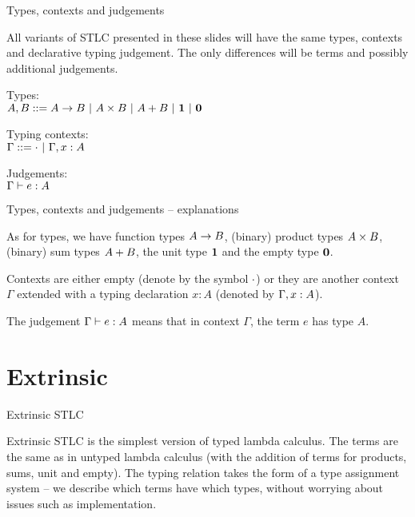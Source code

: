 \documentclass{beamer}
\begin{document}
\begin{frame}{Types, contexts and judgements}

All variants of STLC presented in these slides will have the same types, contexts and declarative typing judgement. The only differences will be terms and possibly additional judgements.

\vspace{2em}

Types: \\
$A, B ::= A \to B \ |\  A \times B \ |\  A + B \ |\  \textbf{1} \ |\  \textbf{0}$

\vspace{2em}

Typing contexts: \\
$\Gamma ::= \cdot \ |\  \Gamma, x : A$

\vspace{2em}

Judgements: \\
$\Gamma \vdash e : A$

\end{frame}

\begin{frame}{Types, contexts and judgements -- explanations}

As for types, we have function types $A \to B$, (binary) product types $A \times B$, (binary) sum types $A + B$, the unit type $\textbf{1}$ and the empty type $\textbf{0}$.

\vspace{2em}

Contexts are either empty (denote by the symbol $\cdot$) or they are another context $\Gamma$ extended with a typing declaration $x : A$ (denoted by $\Gamma, x : A$).

\vspace{2em}

The judgement $\Gamma \vdash e : A$ means that in context $\Gamma$, the term $e$ has type $A$.

\end{frame}

\section{Extrinsic}

\begin{frame}{Extrinsic STLC}

Extrinsic STLC is the simplest version of typed lambda calculus. The terms are the same as in untyped lambda calculus (with the addition of terms for products, sums, unit and empty). The typing relation takes the form of a type assignment system -- we describe which terms have which types, without worrying about issues such as implementation.

\end{frame}
\end{document}

